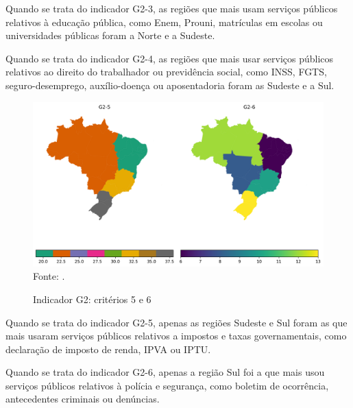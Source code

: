 Quando se trata do indicador G2-3, as regiões que mais usam serviços públicos relativos à educação pública, como Enem, Prouni, matrículas em escolas ou universidades públicas foram a Norte e a Sudeste.

Quando se trata do indicador G2-4, as regiões que mais usar serviços públicos relativos ao direito do trabalhador ou previdência social, como INSS, FGTS, seguro-desemprego, auxílio-doença ou aposentadoria foram as Sudeste e a Sul.

\begin{figure}[H]
	\centering
	\caption{Indicador G2: critérios 5 e 6}
	\includegraphics[width=1\linewidth]{figuras/mapa_coropletico_tic_domicilios_2024_g2_5_6.png}
	\label{fig:mapa_coropletico_tic_domicilios_2024_g2_5_6}
	\footnotesize{Fonte: \cite{tic_domicilios_2024_g2}.}
\end{figure}

Quando se trata do indicador G2-5, apenas as regiões Sudeste e Sul foram as que mais usaram serviços públicos relativos a impostos e taxas governamentais, como declaração de imposto de renda, IPVA ou IPTU.

Quando se trata do indicador G2-6, apenas a região Sul foi a que mais usou serviços públicos relativos à polícia e segurança, como boletim de ocorrência, antecedentes criminais ou denúncias.

